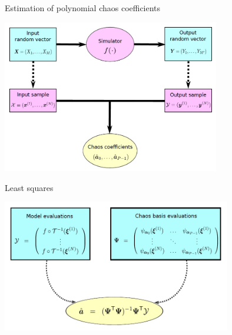 \documentclass[9pt]{beamer}
\begin{document}
\begin{frame}{Estimation of polynomial chaos coefficients}

\small
\begin{center}
 \includegraphics[width=9.5cm]{../Pics/chaos_2.jpg} \\
\end{center}

\end{frame}

\begin{frame}{Least squares}

\begin{center}
 \includegraphics[width=10cm]{../Pics/chaos_3.jpg} \\
 \color{cornellred}{Well-posed problem if $N > P$}
\end{center}

\end{frame}
\end{document}
